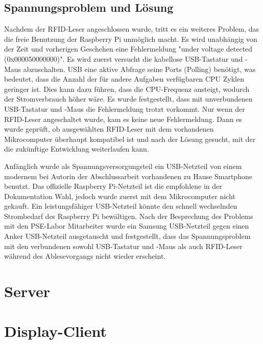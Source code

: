 \subsection{Spannungsproblem und Lösung}
\label{sec:register_client:voltage_issue}
Nachdem der RFID-Leser angeschlossen wurde, tritt es ein weiteres Problem, das die freie Benutzung der Raspberry Pi unmöglich macht. Es wird unabhängig von der Zeit und vorherigen Geschehen eine Fehlermeldung "under voltage detected (0x000050000000)". Es wird zuerst versucht die kabellose USB-Tastatur und -Maus abzuschalten. USB eine aktive Abfrage seine Ports (Polling) benötigt, was bedeutet, dass die Anzahl der für andere Aufgaben verfügbaren CPU Zyklen geringer ist. Dies kann dazu führen, dass die CPU-Frequenz ansteigt, wodurch der Stromverbrauch höher wäre. Es wurde festgestellt, dass mit unverbundenen USB-Tastatur und -Maus die Fehlermeldung trotzt vorkommt. Nur wenn der RFID-Leser angeschaltet wurde, kam es keine neue Fehlermeldung. Dann es wurde geprüft, ob ausgewählten RFID-Leser mit dem vorhandenen Mikrocomputer überhaupt kompatibel ist und nach der Lösung gesucht, mit der die zukünftige Entwicklung weiterlaufen kann.    

Anfänglich wurde als Spannungsversorgungsteil ein USB-Netzteil von einem modernem bei Autorin der Abschlussarbeit vorhandenen zu Hause Smartphone benutzt. Das offizielle Raspberry Pi-Netzteil ist die empfohlene in der Dokumentation Wahl, jedoch wurde zuerst mit dem Mikrocomputer nicht gekauft. Ein leistungsfähiger USB-Netzteil könnte den schnell wechselnden Strombedarf des Raspberry Pi bewältigen. Nach der Besprechung des Problems mit den PSE-Labor Mitarbeiter wurde ein Samsung USB-Netzteil gegen einen Anker USB-Netzteil ausgetauscht und festgestellt, dass das Spannungsproblem mit den verbundenen sowohl USB-Tastatur und -Maus als auch RFID-Leser während des Ablesevorgangs nicht wieder erscheint. 
\section{Server}
\label{sec:server}


\section{Display-Client}
\label{sec:display_client}
